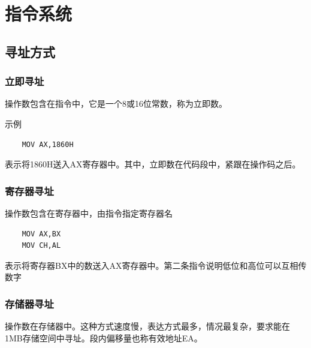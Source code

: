 \chapter{指令系统}
\section{寻址方式}
\subsection{立即寻址}
操作数包含在指令中，它是一个8或16位常数，称为立即数。

示例
\begin{lstlisting}
    MOV AX,1860H
\end{lstlisting}
表示将1860H送入AX寄存器中。其中，立即数在代码段中，紧跟在操作码之后。
\subsection{寄存器寻址}
操作数包含在寄存器中，由指令指定寄存器名
\begin{lstlisting}
    MOV AX,BX
    MOV CH,AL
\end{lstlisting}
表示将寄存器BX中的数送入AX寄存器中。第二条指令说明低位和高位可以互相传数字
\subsection{存储器寻址}
操作数在存储器中。这种方式速度慢，表达方式最多，情况最复杂，要求能在1MB存储空间中寻址。段内偏移量也称有效地址EA。

